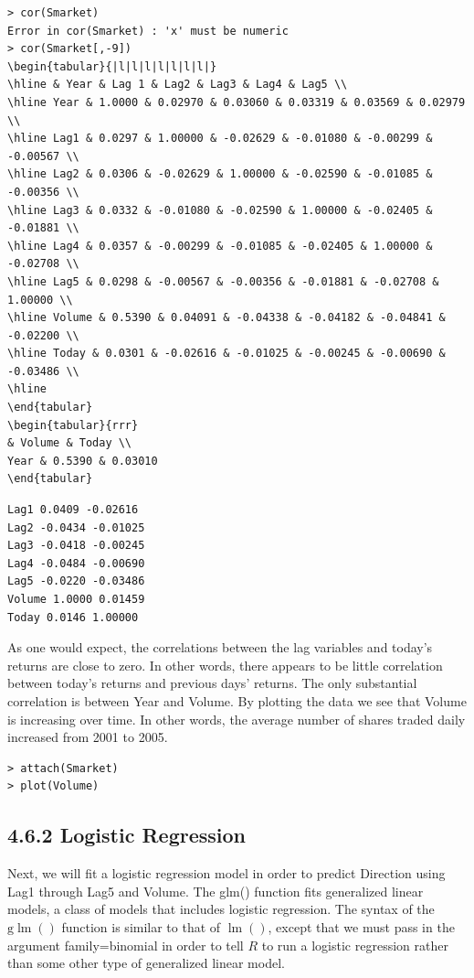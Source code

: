 \documentclass[10pt]{article}
\begin{document}
\begin{verbatim}
> cor(Smarket)
Error in cor(Smarket) : 'x' must be numeric
> cor(Smarket[,-9])
\begin{tabular}{|l|l|l|l|l|l|l|}
\hline & Year & Lag 1 & Lag2 & Lag3 & Lag4 & Lag5 \\
\hline Year & 1.0000 & 0.02970 & 0.03060 & 0.03319 & 0.03569 & 0.02979 \\
\hline Lag1 & 0.0297 & 1.00000 & -0.02629 & -0.01080 & -0.00299 & -0.00567 \\
\hline Lag2 & 0.0306 & -0.02629 & 1.00000 & -0.02590 & -0.01085 & -0.00356 \\
\hline Lag3 & 0.0332 & -0.01080 & -0.02590 & 1.00000 & -0.02405 & -0.01881 \\
\hline Lag4 & 0.0357 & -0.00299 & -0.01085 & -0.02405 & 1.00000 & -0.02708 \\
\hline Lag5 & 0.0298 & -0.00567 & -0.00356 & -0.01881 & -0.02708 & 1.00000 \\
\hline Volume & 0.5390 & 0.04091 & -0.04338 & -0.04182 & -0.04841 & -0.02200 \\
\hline Today & 0.0301 & -0.02616 & -0.01025 & -0.00245 & -0.00690 & -0.03486 \\
\hline
\end{tabular}
\begin{tabular}{rrr} 
& Volume & Today \\
Year & 0.5390 & 0.03010
\end{tabular}
\end{verbatim}

\begin{verbatim}
Lag1 0.0409 -0.02616
Lag2 -0.0434 -0.01025
Lag3 -0.0418 -0.00245
Lag4 -0.0484 -0.00690
Lag5 -0.0220 -0.03486
Volume 1.0000 0.01459
Today 0.0146 1.00000
\end{verbatim}

As one would expect, the correlations between the lag variables and today's returns are close to zero. In other words, there appears to be little correlation between today's returns and previous days' returns. The only substantial correlation is between Year and Volume. By plotting the data we see that Volume is increasing over time. In other words, the average number of shares traded daily increased from 2001 to 2005.

\begin{verbatim}
> attach(Smarket)
> plot(Volume)
\end{verbatim}

\subsection*{4.6.2 Logistic Regression}
Next, we will fit a logistic regression model in order to predict Direction using Lag1 through Lag5 and Volume. The glm() function fits generalized linear models, a class of models that includes logistic regression. The syntax of the $\mathrm{g} \operatorname{lm}()$ function is similar to that of $\operatorname{lm}()$, except that we must pass in the argument family=binomial in order to tell $R$ to run a logistic regression rather than some other type of generalized linear model.
\end{document}
